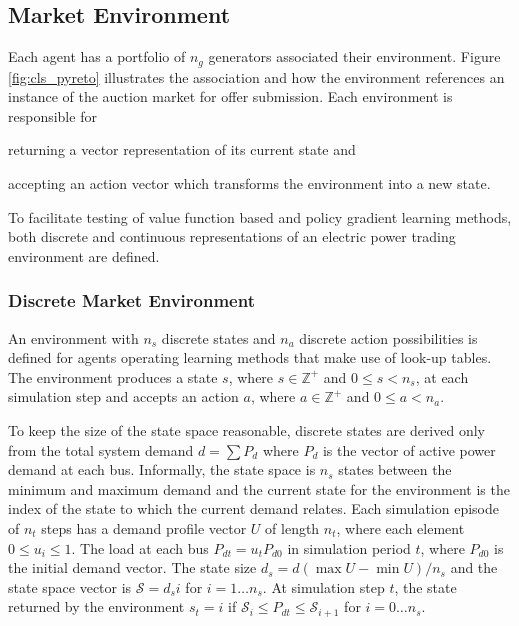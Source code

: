 \subsection{Market Environment}
Each agent has a portfolio of $n_g$ generators associated their environment.
Figure \ref{fig:cls_pyreto} illustrates the association and how the environment
references an instance of the auction market for offer submission.  Each
environment is responsible for \begin{inparaenum}[(i)] \item returning a
vector representation of its current state and \item accepting an action
vector which transforms the environment into a new state. \end{inparaenum}  To
facilitate testing of value function based and policy gradient learning
methods, both discrete and continuous representations of an electric power
trading environment are defined.


\subsubsection{Discrete Market Environment}
An environment with $n_s$ discrete states and $n_a$ discrete action
possibilities is defined for agents operating learning methods that make use of
look-up tables. The environment produces a state $s$, where $s \in \mathbb{Z}^+$
and $0\leq s < n_s$, at each simulation step and accepts an action $a$, where $a
\in \mathbb{Z}^+$ and $0\leq a < n_a$.

To keep the size of the state space reasonable, discrete states are derived only
from the total system demand $d=\sum P_d$ where $P_d$ is the vector of active
power demand at each bus.  Informally, the state space is $n_s$ states between the minimum and maximum
demand and the current state for the environment is the index of the state to
which the current demand relates.  Each simulation episode of $n_t$ steps has a
demand profile vector $U$ of length $n_t$, where each element $0 \leq u_i \leq 1$. The
load at each bus $P_{dt} = u_tP_{d0}$ in simulation period $t$, where $P_{d0}$
is the initial demand vector.  The state
size $d_s = d(\max U - \min U)/n_s$ and the state space vector is $\mathscr{S}=d_si$ for
 $i=1\dotsc n_s$. At simulation step $t$, the state returned by the environment
 $s_t = i$ if
$\mathscr{S}_i \leq P_{dt} \leq \mathscr{S}_{i+1}$ for $i = 0\dotsc n_s$.


